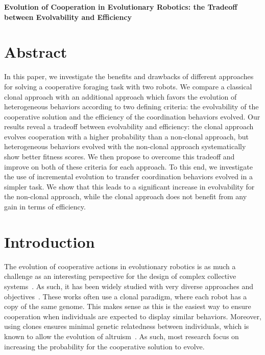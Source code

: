 \clearpage

\begin{flushleft}
\textbf{\Huge Evolution of Cooperation in Evolutionary Robotics: the Tradeoff between Evolvability and Efficiency}
\end{flushleft}

\section{Abstract}
  In this paper, we investigate the benefits and drawbacks of different approaches for solving a cooperative foraging task with two robots. We compare a classical clonal approach with an additional approach which favors the evolution of heterogeneous behaviors according to two defining criteria: the evolvability of the cooperative solution and the efficiency of the coordination behaviors evolved. Our results reveal a tradeoff between evolvability and efficiency: the clonal approach evolves cooperation with a higher probability than a non-clonal approach, but heterogeneous behaviors evolved with the non-clonal approach systematically show better fitness scores. We then propose to overcome this tradeoff and improve on both of these criteria for each approach. To this end, we investigate the use of incremental evolution to transfer coordination behaviors evolved in a simpler task. We show that this leads to a significant increase in evolvability for the non-clonal approach, while the clonal approach does not benefit from any gain in terms of efficiency.


\section{Introduction}

  The evolution of cooperative actions in evolutionary robotics is as much a challenge as an interesting perspective for the design of complex collective systems~\parencite{Doncieux2015a}. As such, it has been widely studied with very diverse approaches and objectives~\parencite{Waibel2009, Hauert2014, Trianni2007, Lichocki2012}. These works often use a clonal paradigm, where each robot has a copy of the same genome. This makes sense as this is the easiest way to ensure cooperation when individuals are expected to display similar behaviors. Moreover, using clones ensures minimal genetic relatedness between individuals, which is known to allow the evolution of altruism~\parencite{Waibel2011, Montanier2011}. As such, most research focus on increasing the probability for the cooperative solution to evolve.


